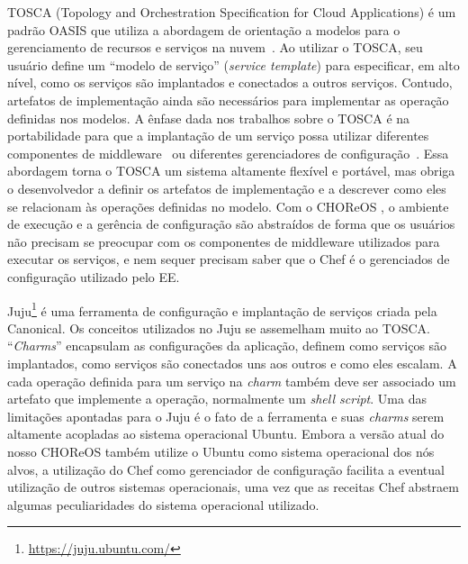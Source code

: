 
TOSCA (Topology and Orchestration Specification for Cloud Applications)
é um padrão OASIS que utiliza a abordagem de orientação a modelos para
o gerenciamento de recursos e serviços na nuvem~\cite{Wettinger2013Tosca}.
Ao utilizar o TOSCA, seu usuário define um ``modelo de serviço'' (\emph{service template})
para especificar, em alto nível, como os serviços são implantados e conectados a outros serviços.
Contudo, artefatos de implementação ainda são necessários
para implementar as operação definidas nos modelos.
A ênfase dada nos trabalhos sobre o TOSCA é na portabilidade
para que a implantação de um serviço possa utilizar diferentes
componentes de middleware~\cite{Wettinger2013ExtensiblePaaS} 
ou diferentes gerenciadores de configuração~\cite{Wettinger2013Tosca}.
Essa abordagem torna o TOSCA um sistema altamente flexível e portável,
mas obriga o desenvolvedor a definir os
artefatos de implementação e a descrever como eles se
relacionam às operações definidas no modelo.
Com o CHOReOS \ee, o ambiente de execução e a gerência de configuração são
abstraídos de forma que os usuários não precisam se preocupar
com os componentes de middleware utilizados para executar os serviços,
e nem sequer precisam saber que o Chef é o gerenciados de configuração
utilizado pelo EE.

Juju\footnote{\url{https://juju.ubuntu.com/}} é uma ferramenta 
de configuração e implantação de serviços criada pela Canonical.
Os conceitos utilizados no Juju se assemelham muito ao TOSCA.
``\emph{Charms}'' encapsulam as configurações da aplicação,
definem como serviços são implantados, como serviços
são conectados uns aos outros e como eles escalam.
A cada operação definida para um serviço na \emph{charm}
também deve ser associado um artefato que implemente a operação,
normalmente um \emph{shell script}.
Uma das limitações apontadas para o Juju é o fato
de a ferramenta e suas \emph{charms} serem altamente acopladas ao
sistema operacional Ubuntu.
Embora a versão atual do nosso CHOReOS \ee também utilize o Ubuntu
como sistema operacional dos nós alvos,
a utilização do Chef como gerenciador de configuração
facilita a eventual utilização de outros sistemas operacionais,
uma vez que as receitas Chef abstraem algumas peculiaridades
do sistema operacional utilizado.

